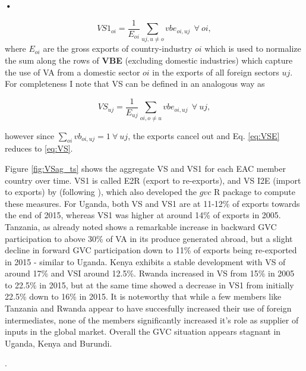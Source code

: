 \textbf{\textbf{•}}\documentclass[a4paper]{article}
\begin{document}
\begin{equation} \label{eq:VS1}
VS1_{oi} = \frac{1}{E_{oi}} \sum_{uj, u \neq  o} vbe_{oi, uj}\ \ \forall\ oi,
\end{equation}
where $E_{oi}$ are the gross exports of country-industry $oi$ which is used to normalize the sum along the rows of \textbf{VBE} (excluding domestic industries) which capture the use of VA from a domestic sector $oi$ in the exports of all foreign sectors $uj$. For completeness I note that VS can be defined in an analogous way as

\begin{equation} \label{eq:VSE}
VS_{uj} = \frac{1}{E_{uj}} \sum_{oi, o \neq  u} vbe_{oi, uj}\ \ \forall\ uj,
\end{equation}

however since $\sum_{oi} vb_{oi, uj} = 1\ \forall\ uj$, the exports cancel out and Eq. \ref{eq:VSE} reduces to \ref{eq:VS}. \newline

Figure \ref{fig:VSag_ts} shows the aggregate VS and VS1 for each EAC member country over time. VS1 is called E2R (export to re-exports), and VS I2E (import to exports) by \citet{Kummritz20162} (following \citet{baldwin2015supply}), which also developed the $gvc$ R package to compute these measures. For Uganda, both VS and VS1 are at 11-12\% of exports towards the end of 2015, whereas VS1 was higher at around 14\% of exports in 2005. Tanzania, as already noted shows a remarkable increase in backward GVC participation to above 30\% of VA in its produce generated abroad, but a slight decline in forward GVC participation down to 11\% of exports being re-exported in 2015 - similar to Uganda. Kenya exhibits a stable development with VS of around 17\% and VSI around 12.5\%. Rwanda increased in VS from 15\% in 2005 to 22.5\% in 2015, but at the same time showed a decrease in VS1 from initially 22.5\% down to 16\% in 2015. It is noteworthy that while a few members like Tanzania and Rwanda appear to have succesfully increased their use of foreign intermediates, none of the members significantly increased it's role as supplier of inputs in the global market. Overall the GVC situation appears stagnant in Uganda, Kenya and Burundi. 

. 
\end{document}
